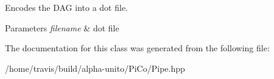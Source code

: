 \-Encodes the \-D\-A\-G into a dot file. 
\begin{DoxyParams}{\-Parameters}
{\em filename} & dot file \\
\hline
\end{DoxyParams}


\-The documentation for this class was generated from the following file\-:\begin{DoxyCompactItemize}
\item 
/home/travis/build/alpha-\/unito/\-Pi\-Co/\-Pipe.\-hpp\end{DoxyCompactItemize}

